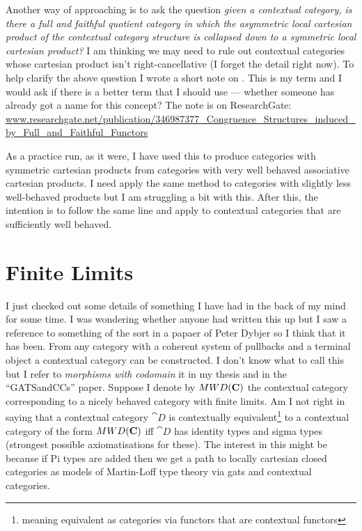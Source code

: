 \documentclass[10pt,a4paper]{article}
\theoremstyle{remark}
\newcommand{\myurl}[1]{{\footnotesize \url{#1}}}
\begin{document}
\note Another way of approaching is to ask the question \textit{ given a contextual category, is there a full and faithful quotient category in which the asymmetric local cartesian product of the contextual category structure is collapsed down to a symmetric local cartesian product?} I am thinking we may need to rule out contextual categories whose 
cartesian product isn't right-cancellative (I forget the detail right now). 
\note
To help clarify the above question I wrote a short note on .  This is my term and I would ask if there is a better term that I should use --- whether someone has already got a  name for this concept? The note is on ResearchGate: \\
\myurl{www.researchgate.net/publication/346987377_Congruence_Structures_induced_by_Full_and_Faithful_Functors}

As a practice run, as it were, I have used this to produce categories with symmetric cartesian products from categories with very well behaved associative cartesian products. I need apply the same method to categories with slightly less well-behaved products but I am struggling a bit with this. After this, the intention is to follow the same line and apply to contextual categories that are sufficiently well behaved.

\section{Finite Limits}
\note 
I just checked out some details of something I have had in the back of my mind for some time. 
I was wondering whether anyone had written this up but I saw a reference to something of the sort in a papaer of Peter Dybjer so I think that it  has been.
 From any category with a coherent system of pullbacks and a terminal object a contextual category can be constructed. I don't know what to call this but 
I refer to \textit{morphisms with codomain} it in my thesis and in the ``GATSandCCs'' paper.
Suppose I denote by $MWD(\textbf{C})$ the contextual category corresponding to a nicely behaved category \catcw with finite limits. Am I not right in saying that a contextual category $\cat{D}$ is contextually equivalent\footnote{meaning equivalent as categories via functors that are contextual functors} to 
a contextual category of the form $MWD(\textbf{C})$ iff $\cat{D}$ has identity types and sigma types
(strongest possible axiomatisations for these). The interest in this might be because if Pi types are added then we get  a path to locally cartesian closed categories as models of Martin-Loff type theory via gats and contextual categories. 
\end{document}
